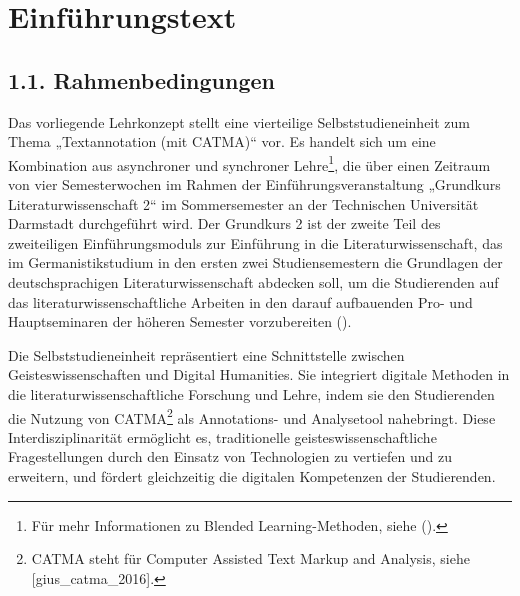 \documentclass[
          a4paper,
        ]{article}
\begin{document}
\pagestyle{plain}


\maketitle
















\pagestyle{page}

\renewcommand{\arraystretch}{3}  %

\section{Einführungstext}\label{einfuxfchrungstext}

\subsection{1.1. Rahmenbedingungen}\label{rahmenbedingungen}

Das vorliegende Lehrkonzept stellt eine vierteilige Selbststudieneinheit
zum Thema „Textannotation (mit CATMA)`` vor. Es handelt sich um eine
Kombination aus asynchroner und synchroner Lehre\footnote{Für mehr
  Informationen zu Blended Learning-Methoden, siehe
  ().}, die über einen Zeitraum von vier Semesterwochen im Rahmen
der Einführungsveranstaltung „Grundkurs Literaturwissenschaft 2`` im
Sommersemester an der Technischen Universität Darmstadt durchgeführt
wird. Der Grundkurs 2 ist der zweite Teil des zweiteiligen
Einführungsmoduls zur Einführung in die Literaturwissenschaft, das im
Germanistikstudium in den ersten zwei Studiensemestern die Grundlagen
der deutschsprachigen Literaturwissenschaft abdecken soll, um die
Studierenden auf das literaturwissenschaftliche Arbeiten in den darauf
aufbauenden Pro- und Hauptseminaren der höheren Semester vorzubereiten
().

Die Selbststudieneinheit repräsentiert eine Schnittstelle zwischen
Geisteswissenschaften und Digital Humanities. Sie integriert digitale
Methoden in die literaturwissenschaftliche Forschung und Lehre, indem
sie den Studierenden die Nutzung von CATMA\footnote{CATMA steht für
  Computer Assisted Text Markup and Analysis, siehe
  {[}gius\_catma\_2016{]}.} als Annotations- und Analysetool nahebringt.
Diese Interdisziplinarität ermöglicht es, traditionelle
geisteswissenschaftliche Fragestellungen durch den Einsatz von
Technologien zu vertiefen und zu erweitern, und fördert gleichzeitig die
digitalen Kompetenzen der Studierenden.
\end{document}
